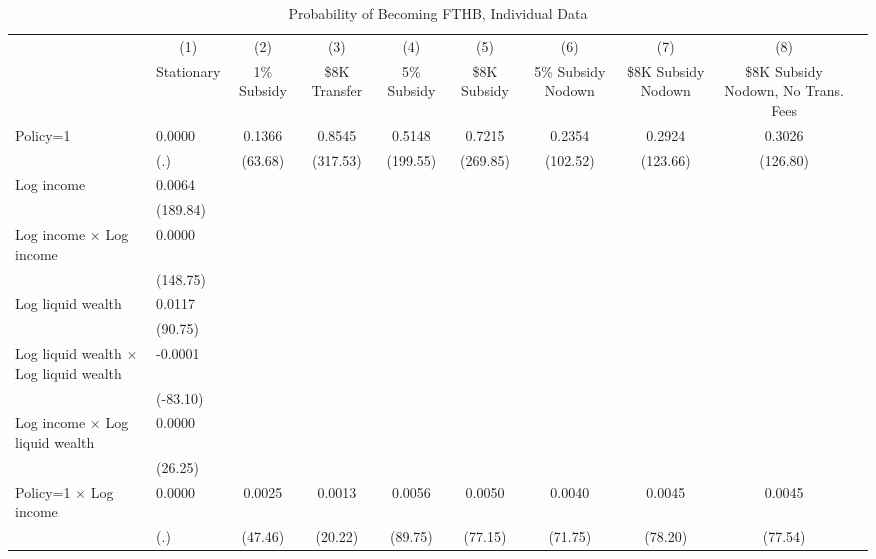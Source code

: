 \begin{table}[h!tbp]\centering
\footnotesize
\caption{Probability of Becoming FTHB, Individual Data}
\begin{tabular}{p{1.2in}l*{8}{c}}
\hline\hline
                    &\multicolumn{1}{c}{(1)}&\multicolumn{1}{c}{(2)}&\multicolumn{1}{c}{(3)}&\multicolumn{1}{c}{(4)}&\multicolumn{1}{c}{(5)}&\multicolumn{1}{c}{(6)}&\multicolumn{1}{c}{(7)}&\multicolumn{1}{c}{(8)}\\
                    &\multicolumn{1}{c}{Stationary}&\multicolumn{1}{c}{1\% Subsidy}&\multicolumn{1}{c}{\$8K Transfer}&\multicolumn{1}{c}{5\% Subsidy}&\multicolumn{1}{c}{\$8K Subsidy}&\multicolumn{1}{c}{5\% Subsidy Nodown}&\multicolumn{1}{c}{\$8K Subsidy Nodown}&\multicolumn{1}{c}{\$8K Subsidy Nodown, No Trans. Fees}\\
\midrule
Policy=1             &      0.0000&      0.1366&      0.8545&      0.5148&      0.7215&      0.2354&      0.2924&      0.3026\\
                    &         (.)&     (63.68)&    (317.53)&    (199.55)&    (269.85)&    (102.52)&    (123.66)&    (126.80)\\
[1em]
Log income          &      0.0064&      &      &    &    &    &    & \\
                    &    (189.84)&      &    &    &    &    &    & \\
[1em]
Log income $\times$ Log income&      0.0000&      &      &    &    &    &    & \\
                    &    (148.75)&      &    &    &    &    &    & \\
[1em]
Log liquid wealth   &      0.0117&      &      &    &    &    &    & \\
                    &     (90.75)&      &     &    &    &    &    & \\
[1em]
Log liquid wealth $\times$ Log liquid wealth&     -0.0001&      &     &    &    &    &    & \\
                    &    (-83.10)&      &    &    &    &    &    & \\
[1em]
Log income $\times$ Log liquid wealth&      0.0000&      &      &    &    &    &    & \\
                    &     (26.25)&      &     &    &    &    &    & \\
[1em]
Policy=1 $\times$ Log income&      0.0000&      0.0025&      0.0013&      0.0056&      0.0050&      0.0040&      0.0045&      0.0045\\
                    &         (.)&     (47.46)&     (20.22)&     (89.75)&     (77.15)&     (71.75)&     (78.20)&     (77.54)\\

\end{tabular}
\end{table}

